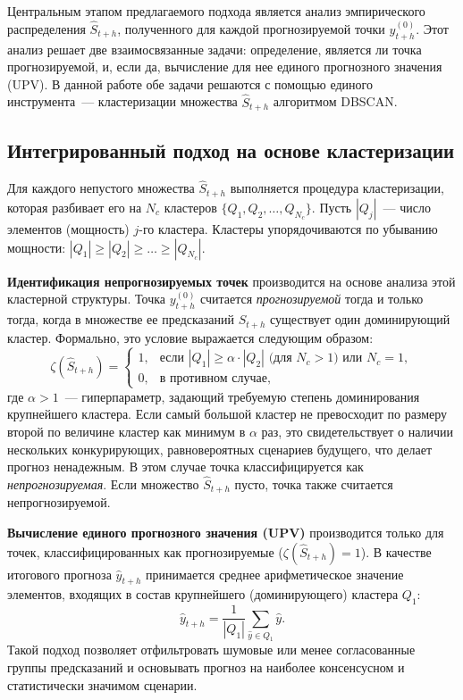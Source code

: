 \documentclass[a4paper,12pt]{extarticle}
\begin{document}
Центральным этапом предлагаемого подхода является анализ эмпирического распределения
 $\hat{S}_{t+h}$, полученного для каждой прогнозируемой точки $y_{t+h}^{(0)}$. Этот
  анализ решает две взаимосвязанные задачи: определение, является ли точка прогнозируемой,
   и, если да, вычисление для нее единого прогнозного значения (UPV). В данной работе обе
   задачи решаются с помощью единого инструмента~--- кластеризации множества $\hat{S}_{t+h}$ алгоритмом DBSCAN. \cite{Aggarwal2013}

\subsection{Интегрированный подход на основе кластеризации}

Для каждого непустого множества $\hat{S}_{t+h}$ выполняется процедура кластеризации,
 которая разбивает его на $N_c$ кластеров $\{Q_1, Q_2, \dots, Q_{N_c}\}$. Пусть $|Q_j|$~--- число
  элементов (мощность) $j$-го кластера. Кластеры упорядочиваются по убыванию мощности:
   $|Q_1| \ge |Q_2| \ge \dots \ge |Q_{N_c}|$.

\textbf{Идентификация непрогнозируемых точек} производится на основе анализа этой
кластерной структуры. Точка $y_{t+h}^{(0)}$ считается \textit{прогнозируемой} тогда
 и только тогда, когда в множестве ее предсказаний $\hat{S}_{t+h}$ существует один
 доминирующий кластер. Формально, это условие выражается следующим образом:
\[
\zeta(\hat{S}_{t+h}) =
\begin{cases}
1, & \text{если } |Q_1| \ge \alpha \cdot |Q_2| \text{ (для } N_c > 1\text{) или } N_c = 1, \\
0, & \text{в противном случае,}
\end{cases}
\]
где $\alpha > 1$~--- гиперпараметр, задающий требуемую степень доминирования
 крупнейшего кластера. Если самый большой кластер не превосходит по размеру
 второй по величине кластер как минимум в $\alpha$ раз, это свидетельствует о
 наличии нескольких конкурирующих, равновероятных сценариев будущего, что делает
  прогноз ненадежным. В этом случае точка классифицируется как \textit{непрогнозируемая}.
   Если множество $\hat{S}_{t+h}$ пусто, точка также считается непрогнозируемой.

\textbf{Вычисление единого прогнозного значения (UPV)} производится только для
 точек, классифицированных как прогнозируемые ($\zeta(\hat{S}_{t+h})=1$). В качестве итогового прогноза $\hat{y}_{t+h}$ принимается среднее арифметическое значение элементов, входящих в состав крупнейшего (доминирующего) кластера $Q_1$:
\[
\hat{y}_{t+h} = \frac{1}{|Q_1|} \sum_{\hat{y} \in Q_1} \hat{y}.
\]
Такой подход позволяет отфильтровать шумовые или менее согласованные группы
предсказаний и основывать прогноз на наиболее консенсусном и статистически значимом сценарии.
\end{document}
